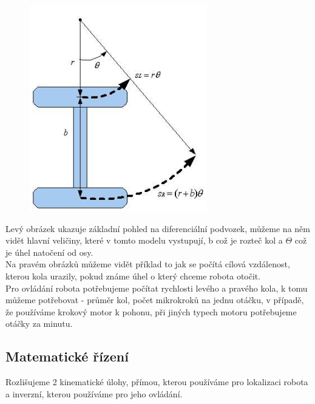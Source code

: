 \begin{figure}[h!]
\begin{minipage}[b]{0.4\textwidth}
        \includegraphics[width = \textwidth]{img/RotCal.png}
    \end{minipage}
\end{figure}

Levý obrázek ukazuje základní pohled na diferenciální podvozek, můžeme na něm vidět hlavní veličiny, které v tomto modelu vystupují, b což je rozteč kol a \(\Theta \) což je úhel natočení od osy.\\
Na pravém obrázků můžeme vidět příklad to jak se počítá cílová vzdálenost, kterou kola urazily, pokud známe úhel o který chceme robota otočit.\\
Pro ovládání robota potřebujeme počítat rychlosti levého a pravého kola, k tomu můžeme potřebovat - průměr kol, počet mikrokroků na jednu otáčku, v případě, že používáme krokový motor k pohonu, při jiných typech motoru potřebujeme otáčky za minutu. \\

\subsection{Matematické řízení}
Rozlišujeme 2 kinematické úlohy, přímou, kterou používáme pro lokalizaci robota a inverzní, kterou používáme pro jeho ovládání.\\
